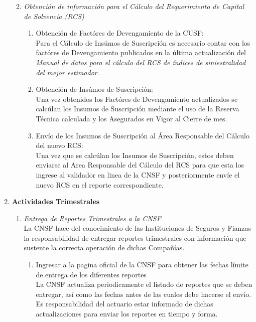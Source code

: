 \documentclass[11pt,twoside,openright,spanish]{report}
\numberwithin{equation}{chapter}
\numberwithin{figure}{chapter}
\numberwithin{table}{chapter}
\begin{document}
\begin{singlespace}
\begin{enumerate}
\begin{enumerate}
\begin{enumerate}
			\end{enumerate}
			\item \textit{Obtención de información para el Cálculo del Requerimiento de Capital de Solvencia (RCS)} 
			\begin{enumerate} 
				\item Obtención de Factóres de Devengamiento de la CUSF:\\ \-\hspace{0.5cm}
				Para el Cálculo de Insúmos de Suscripción es necesario contar con los factóres de Devengamiento publicados en la última actualización del \textit{Manual de datos para el cálculo del RCS de índices de siniestralidad del mejor estimador}.
				\item Obtención de Insúmos de Suscripción:\\ \-\hspace{0.5cm}
				Una vez obtenidos los Factóres de Devengamiento actualizados se calcúlan los Insumos de Suscripción mediante el uso de la Reserva Técnica calculada y los Asegurados en Vigor al Cierre de mes.
				\item Envío de los Insumos de Suscripción al Área Responsable del Cálculo del nuevo RCS:\\ \-\hspace{0.5cm} Una vez que se calcúlan los Insumos de Suscripción, estos deben enviarse al Area Responsable del Cálculo del RCS para que esta los ingrese al validador en linea de la CNSF y posteriormente envíe el nuevo RCS en el reporte correspondiente.\\ 
			\end{enumerate}
		\end{enumerate}
		\item \textbf{Actividades Trimestrales}
		\begin{enumerate}
			\item \textit{Entrega de Reportes Trimestrales a la CNSF} \\ \-\hspace{0.5cm}
			La CNSF hace del conocimiento de las Instituciones de Seguros y Fianzas la responsabilidad de entregar reportes trimestrales con información que sustente la correcta operación de dichas Compañías.
			\begin{enumerate}
				\item {Ingresar a la pagina oficial de la CNSF para obtener las fechas límite de entrega de los diferentes reportes} \\ \-\hspace{0.5cm}
				La CNSF actualiza periodicamente el listado de reportes que se deben entregar, así como las fechas antes de las cuales debe hacerse el envío. Es responsabilidad del actuario estar informado de dichas actualizaciones para enviar los reportes en tiempo y forma.

\end{enumerate}
\end{enumerate}
\end{enumerate}
\end{singlespace}
\end{document}
